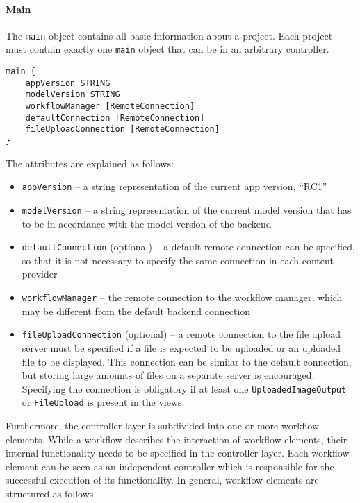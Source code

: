 
\paragraph{Main}
The \lstinline!main! object contains all basic information about a project. Each project must contain exactly one \lstinline!main! object that can be in an arbitrary controller.

\begin{lstlisting}
main {
	appVersion STRING
	modelVersion STRING
	workflowManager [RemoteConnection]
	defaultConnection [RemoteConnection]
	fileUploadConnection [RemoteConnection]
}
\end{lstlisting}

The attributes are explained as follows:
\begin{itemize}
\item \lstinline!appVersion! -- a string representation of the current app version, \eg \enquote{RC1}
\item  \lstinline!modelVersion! -- a string representation of the current model version that has to be in accordance with the model version of the backend
\item  \lstinline!defaultConnection! (optional) -- a default remote connection can be specified, so that it is not necessary to specify the same connection in each content provider
\item \lstinline!workflowManager! -- the remote connection to the workflow manager, which may be different from the default backend connection
\item \lstinline!fileUploadConnection! (optional) -- a remote connection to the file upload server must be specified if a file is expected to be uploaded or an uploaded file to be displayed. This connection can be similar to the default connection, but storing large amounts of files on a separate server is encouraged. Specifying the connection is obligatory if at least one \lstinline!UploadedImageOutput! or \lstinline!FileUpload! is present in the views.
\end{itemize}

Furthermore, the controller layer is subdivided into one or more workflow elements. While a workflow describes the interaction of workflow elements, their internal functionality needs to be specified in the controller layer. Each workflow element can be seen as an independent controller which is responsible for the successful execution of its functionality. In general, workflow elements are structured as follows

